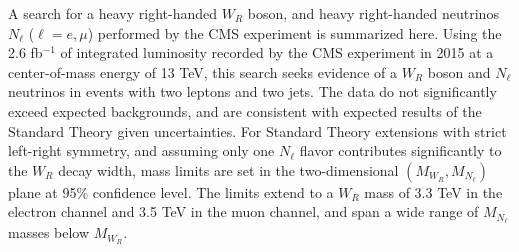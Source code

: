 A search for a heavy right-handed $W_{R}$ boson, and heavy right-handed neutrinos $N_{\ell}$ ($\ell = e, \mu$) performed by the 
CMS experiment is summarized here.  Using the 2.6 fb$^{-1}$ of integrated luminosity recorded by the CMS experiment in
2015 at a center-of-mass energy of 13 TeV, this search seeks evidence of a $W_{R}$ boson and $N_{\ell}$ neutrinos in events with two 
leptons and two jets.  The data do not significantly exceed expected backgrounds, and are consistent with expected results 
of the Standard Theory given uncertainties.  For Standard Theory extensions with strict left-right symmetry, and assuming 
only one $N_{\ell}$ flavor contributes significantly to the $W_{R}$ decay width, mass limits are set in the two-dimensional 
$(M_{W_{R}}, M_{N_{\ell}})$ plane at 95\% confidence level.  The limits extend to a $W_{R}$ mass of 3.3 TeV in the electron channel 
and 3.5 TeV in the muon channel, and span a wide range of $M_{N_{\ell}}$ masses below $M_{W_{R}}$.

